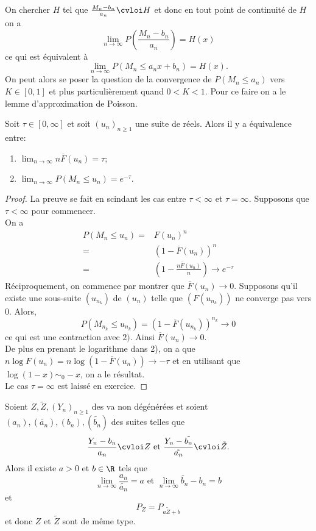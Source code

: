 \documentclass[10p,a4paper,reqno,titlepage]{report}
\begin{document}
On chercher $H$ tel que $ \frac{M_n - b_n}{a_n} \cvloi H$ et donc en tout point de continuité de $H$ on a 
$$ \lim_{n\to \infty} P\left(\frac{M_n -b_n}{a_n}\right)=H(x)$$
ce qui est équivalent à 
$$ \lim_{n\to \infty} P(M_n \leq a_n x +b_n) = H(x).$$
On peut alors se poser la question de la convergence de $P(M_n \leq a_n)$ vers $K \in [0,1]$ et plus particulièrement quand $0 < K < 1.$ Pour ce faire on a le lemme d'approximation de Poisson.
\begin{lemme}\label{lemmepoisson}
Soit $\tau \in [0,\infty]$ et soit $(u_n)_{n\geq 1}$ une suite de réels. Alors il y a équivalence entre:\
\begin{enumerate}
	\item $ \lim_{n\to\infty} n \overline{F}(u_n) = \tau$;
	\item $\lim_{n \to \infty} P(M_n \leq u_n) = e^{-\tau}.$
\end{enumerate}
\end{lemme}
\begin{proof}
	La preuve se fait en scindant les cas entre $\tau < \infty$ et $\tau=\infty.$ Supposons que $\tau < \infty$ pour commencer. \\
	On a 
	\begin{align*}
		P(M_n \leq u_n) = & F(u_n)^n\\
		=& (1-\overline{F}(u_n))^n \\
		= & \left(1- \frac{n\overline{F}(u_n)}{n}\right) \to e^{-\tau}
	\end{align*}
Réciproquement, on commence par montrer que $\overline{F}(u_n) \to 0$. Supposons qu'il existe une sous-suite $(u_{n_k})$ de $(u_n)$ telle que $(F(u_{n_k}))$ ne converge pas vers $0$. Alors,
$$ P(M_{n_k} \leq u_{n_k}) =\left(1 - \overline{F}(u_{n_k})\right)^{n_k}\to 0 $$
ce qui est une contraction avec $2)$. Ainsi $\overline{F}(u_n) \to 0$. \\
De plus en prenant le logarithme dans 2), on a que $n \log F(u_n) = n \log(1-\overline{F}(u_n)) \to -\tau$ et en utilisant que $\log(1-x) \sim_0 -x$, on a le résultat.\\
Le cas $\tau=\infty$ est laissé en exercice.

\end{proof}
\begin{prop}\label{CTT}
	Soient $Z , \tilde Z , (Y_n)_{n\geq 1}$ des va non dégénérées et soient $(a_n), (\tilde{a_n}),(b_n),(\tilde{b_n})$ des suites telles que 
	$$ \frac{Y_n -b_n}{a_n} \cvloi Z \text{ et } \frac{Y_n-\tilde{b_n}}{\tilde{a_n}} \cvloi \tilde Z.$$
	Alors il existe $a > 0$ et $b \in \R$ tels que 
	$$ \lim_{n\to\infty}\frac{a_n}{\tilde{a_n}} =a \text{ et } \lim_{n\to\infty} \tilde{b_n} - b_n = b$$
	 et 
	 $$P_{Z}= P_{a \tilde Z + b}$$
	et donc $Z $ et $\tilde Z $ sont de même type.
\end{prop}
\end{document}

